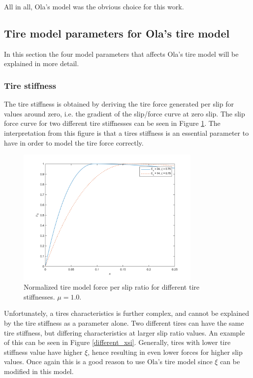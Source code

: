 All in all, Ola's model was the obvious choice for this work.

\subsection{Tire model parameters for Ola's tire model}
In this section the four model parameters that affects Ola's tire model will be explained in more detail.

\subsubsection{Tire stiffness}
The tire stiffness is obtained by deriving the tire force generated per slip for values around zero, i.e. the gradient of the slip/force curve at zero slip. The slip force curve for two different tire stiffnesses can be seen in Figure \ref{different_cx}. The interpretation from this figure is that a tires stiffness is an essential parameter to have in order to model the tire force correctly. 

\begin{figure}[h]
	\centering
	\includegraphics[width=0.8\textwidth]{Pictures/slipkraft_olika_cx}
	\caption {Normalized tire model force per slip ratio for different tire stiffnesses. $ \mu = 1.0 $.}
	\label{different_cx}
\end{figure}

Unfortunately, a tires characteristics is further complex, and cannot be explained by the tire stiffness as a parameter alone. Two different tires can have the same tire stiffness, but differing characteristics at larger slip ratio values. An example of this can be seen in Figure \ref{different_xsi}. Generally, tires with lower tire stiffness value have higher $ \xi $, hence resulting in even lower forces for higher slip values. Once again this is a good reason to use Ola's tire model since $ \xi $ can be modified in this model.

